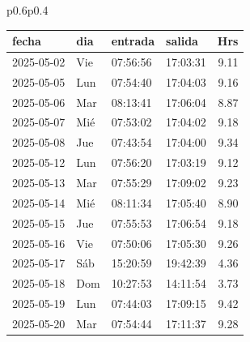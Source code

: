 \documentclass[11pt,a4paper]{article}
\newcommand{\mejoradatabla}[1]{
  \renewcommand{\arraystretch}{1.3}
  \setlength{\tabcolsep}{10pt}
#1
  \renewcommand{\arraystretch}{1}
  \setlength{\tabcolsep}{6pt}
}
\begin{document}
\begin{tabular}{p{}p{}}
\mejoradatabla{
\begin{tabular}{p{2cm} p{0.6cm} p{1.2cm} p{1.2cm} r}
\toprule
\rowcolor{grisclaro} \textbf{fecha} & \textbf{dia} & \textbf{entrada} & \textbf{salida} & \textbf{Hrs}\\
\midrule

\rowcolor{white}%
2025-05-02 & Vie & 07:56:56 & 17:03:31 &9.11\\
\rowcolor{white}%
2025-05-05 & Lun & 07:54:40 & 17:04:03 &9.16\\
\rowcolor{white}%
2025-05-06 & Mar & 08:13:41 & 17:06:04 &8.87\\
\rowcolor{white}%
2025-05-07 & Mié & 07:53:02 & 17:04:02 &9.18\\
\rowcolor{white}%
2025-05-08 & Jue & 07:43:54 & 17:04:00 &9.34\\
\rowcolor{white}%
2025-05-12 & Lun & 07:56:20 & 17:03:19 &9.12\\
\rowcolor{white}%
2025-05-13 & Mar & 07:55:29 & 17:09:02 &9.23\\
\rowcolor{white}%
2025-05-14 & Mié & 08:11:34 & 17:05:40 &8.90\\
\rowcolor{white}%
2025-05-15 & Jue & 07:55:53 & 17:06:54 &9.18\\
\rowcolor{white}%
2025-05-16 & Vie & 07:50:06 & 17:05:30 &9.26\\
\rowcolor{white}%
\rowcolor{corporativo!20}
 2025-05-17  &  Sáb  &  15:20:59  &  19:42:39  &%
         4.36\\
\rowcolor{white}%
\rowcolor{corporativo!20}
 2025-05-18  &  Dom  &  10:27:53  &  14:11:54  &%
         3.73\\
\rowcolor{white}%
2025-05-19 & Lun & 07:44:03 & 17:09:15 &9.42\\
\rowcolor{white}%
2025-05-20 & Mar & 07:54:44 & 17:11:37 &9.28\\

\end{tabular}}
\end{tabular}
\end{document}
